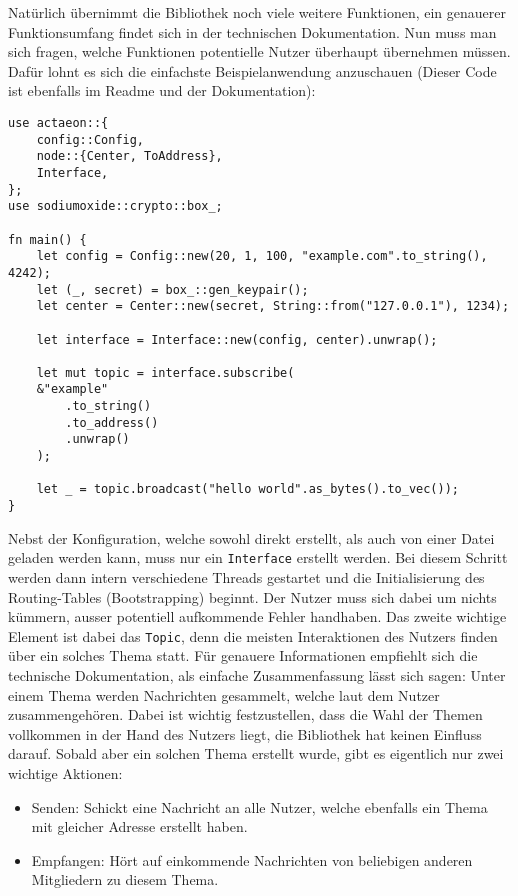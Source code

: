 \documentclass[11pt]{article}
\begin{document}
\noindent Natürlich übernimmt die Bibliothek noch viele weitere
Funktionen, ein genauerer Funktionsumfang findet sich in der
technischen Dokumentation. Nun muss man sich fragen, welche Funktionen
potentielle Nutzer überhaupt übernehmen müssen. Dafür lohnt es sich
die einfachste Beispielanwendung anzuschauen (Dieser Code ist
ebenfalls im Readme und der Dokumentation):
\begin{verbatim}
use actaeon::{
    config::Config,
    node::{Center, ToAddress},
    Interface,
};
use sodiumoxide::crypto::box_;

fn main() {
    let config = Config::new(20, 1, 100, "example.com".to_string(), 4242);
    let (_, secret) = box_::gen_keypair();
    let center = Center::new(secret, String::from("127.0.0.1"), 1234);

    let interface = Interface::new(config, center).unwrap();

    let mut topic = interface.subscribe(
	&"example"
	    .to_string()
	    .to_address()
	    .unwrap()
    );

    let _ = topic.broadcast("hello world".as_bytes().to_vec());
}
\end{verbatim}

\noindent Nebst der Konfiguration, welche sowohl direkt erstellt, als
auch von einer Datei geladen werden kann, muss nur ein \texttt{Interface}
erstellt werden. Bei diesem Schritt werden dann intern verschiedene
Threads gestartet und die Initialisierung des Routing-Tables
(Bootstrapping) beginnt. Der Nutzer muss sich dabei um nichts kümmern,
ausser potentiell aufkommende Fehler handhaben. Das zweite wichtige
Element ist dabei das \texttt{Topic}, denn die meisten Interaktionen des
Nutzers finden über ein solches Thema statt. Für genauere
Informationen empfiehlt sich die technische Dokumentation, als
einfache Zusammenfassung lässt sich sagen: Unter einem Thema werden
Nachrichten gesammelt, welche laut dem Nutzer zusammengehören. Dabei
ist wichtig festzustellen, dass die Wahl der Themen vollkommen in der
Hand des Nutzers liegt, die Bibliothek hat keinen Einfluss darauf.
Sobald aber ein solchen Thema erstellt wurde, gibt es eigentlich nur
zwei wichtige Aktionen: 
\begin{itemize}
\item Senden: Schickt eine Nachricht an alle Nutzer, welche ebenfalls ein
Thema mit gleicher Adresse erstellt haben.
\item Empfangen: Hört auf einkommende Nachrichten von beliebigen anderen
Mitgliedern zu diesem Thema.
\end{itemize}
\end{document}
